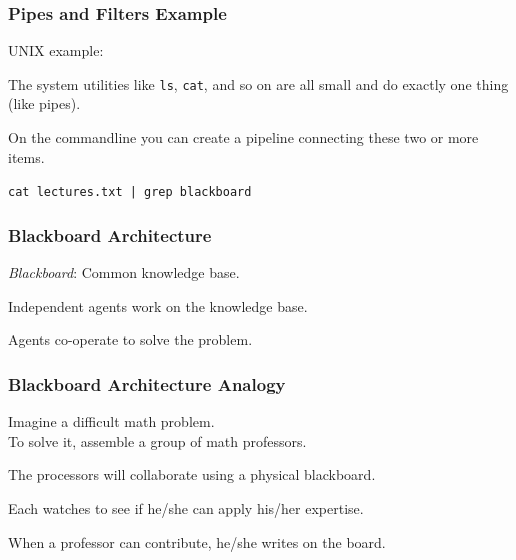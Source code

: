 \begin{frame}
\frametitle{Pipes and Filters Example}

\begin{changemargin}{1cm}
UNIX example: 

The system utilities like \texttt{ls}, \texttt{cat}, and so on are all small and do exactly one thing (like pipes).

On the commandline you can create a pipeline connecting these two or more items.

\texttt{cat lectures.txt | grep blackboard} 

\end{changemargin}
\end{frame}

\begin{frame}
\frametitle{Blackboard Architecture}

\begin{changemargin}{1cm}
\emph{Blackboard}: Common knowledge base.

Independent agents work on the knowledge base.

Agents co-operate to solve the problem.

\end{changemargin}
\end{frame}

\begin{frame}
\frametitle{Blackboard Architecture Analogy}

\begin{changemargin}{1cm}
Imagine a difficult math problem.\\
\quad To solve it, assemble a group of math professors.

The processors will collaborate using a physical blackboard.

Each watches to see if he/she can apply his/her expertise.

When a professor can contribute, he/she writes on the board.

\end{changemargin}
\end{frame}


